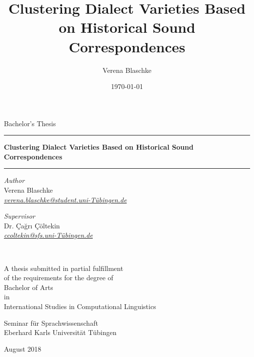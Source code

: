\documentclass[a4paper]{article}
\title{Clustering Dialect Varieties Based on Historical Sound Correspondences}
\author{Verena Blaschke}
\date{\today}
\begin{document}
\begin{titlepage}
\begin{center}

\vspace*{.15\textheight}

{\Large Bachelor's Thesis}
\vspace{2em}

\hrule
\vspace{0.6cm}
{\huge\bfseries
Clustering Dialect Varieties Based on Historical Sound Correspondences
}\\[0.7cm] 
\hrule
\vspace*{.05\textheight}
 
\begin{minipage}[t]{0.4\textwidth}
\begin{flushleft} 
{\large
\textit{Author}\\
Verena Blaschke}\\
\href{mailto:verena.blaschke@student.uni-T\"{u}bingen.de}{\textit{verena.blaschke@student.uni-T\"{u}bingen.de}}\\
\end{flushleft}
\end{minipage}
\begin{minipage}[t]{0.4\textwidth}
\begin{flushright}
{\large
\textit{Supervisor}\\
Dr. Çağrı Çöltekin}\\
\href{mailto:ccoltekin@sfs.uni-T\"{u}bingen.de}{\textit{ccoltekin@sfs.uni-T\"{u}bingen.de}}\\
\end{flushright}
\end{minipage}\\

\vfill

A thesis submitted in partial fulfillment\\
of the requirements for the degree of\\[2mm]
{\large Bachelor of Arts}\\
in\\[1mm]
{\large International Studies in Computational Linguistics}

\vspace*{.1\textheight}

{\large Seminar für Sprachwissenschaft\\
Eberhard Karls Universität Tübingen

\vspace{1em}
August 2018}
\end{center}
	
\end{titlepage}
\end{document}
